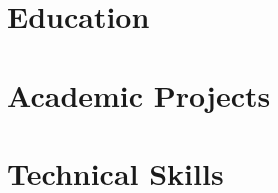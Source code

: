 \documentclass{resume}
\begin{document}
      
  
    \section{Education}
      
  

  
    \section{Academic Projects}
      
  

  
    \section{Technical Skills}
      
  

    
\end{document}

